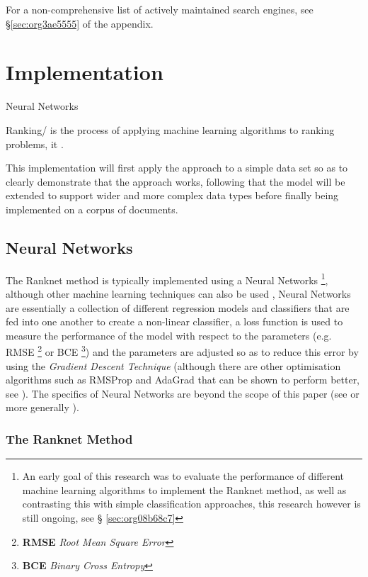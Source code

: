 \documentclass[a4paper,11pt,twoside]{article}
\begin{document}
For a non-comprehensive list of actively maintained search engines,
see \S \ref{sec:org3ae5555} of the appendix.

\section{Implementation}
\label{sec:orgbc10ad2}



Neural Networks 

Ranking/ is the process of applying machine learning algorithms to
ranking problems, it .

This implementation will first apply the approach to a simple data
set so as to clearly demonstrate that the approach works, following
that the model will be extended to support wider and more complex
data types before finally being implemented on a corpus of documents.

\subsection{Neural Networks}
\label{sec:orgffb3f23}

The Ranknet method is typically implemented using a Neural Networks
\footnote{An early goal of this research was to evaluate the performance
of different machine learning algorithms to implement the Ranknet
method, as well as contrasting this with simple classification
approaches, this research however is still ongoing,  see \S
\ref{sec:org08b68c7}},
although other machine learning techniques can also be used
\cite[p. 1]{christopherburgesRankNetRankingRetrospective2015},
Neural Networks are essentially a collection of different
regression models and classifiers that are fed into one another to create a
non-linear classifier, a loss function is used to measure the
performance of the model with respect to the parameters
(e.g. RMSE \footnote{\textbf{RMSE} \emph{Root Mean Square Error}} or BCE \footnote{\textbf{BCE} \emph{Binary Cross Entropy}}) and the parameters are adjusted so
as to reduce this error by using the \emph{Gradient Descent Technique}
(although there are other optimisation algorithms such as RMSProp
and AdaGrad \cite{mukkamalaVariantsRMSPropAdagrad2017} that can be
shown to perform better, see
\cite{bushaevUnderstandingRMSpropFaster2018}). The specifics of
Neural Networks are beyond the scope of this paper (see
\cite{hmkcodeBackpropagationStepStep} or more generally \cite{pictonNeuralNetworks1994}).

\subsubsection{The Ranknet Method}
\label{sec:org30562de}
\end{document}
